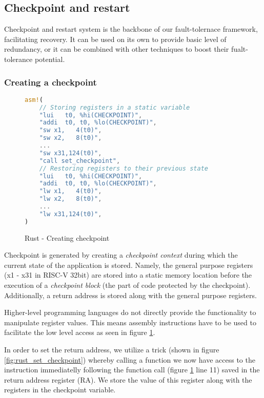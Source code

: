 \subsection{Checkpoint and restart}

Checkpoint and restart system is the backbone of our fault-tolernace framework, facilitating recovery. It can be used on its own to provide basic level of redundancy, or it can be combined with other techniques to boost their fualt-tolerance potential.

\subsubsection{Creating a checkpoint} \label{sec:creating_checkpoint}

\begin{figure}[!h]
\begin{lstlisting}[language=Rust]
asm!(
    // Storing registers in a static variable
    "lui   t0, %hi(CHECKPOINT)",
    "addi  t0, t0, %lo(CHECKPOINT)",
    "sw x1,   4(t0)",
    "sw x2,   8(t0)",
    ...
    "sw x31,124(t0)",
    "call set_checkpoint",
    // Restoring registers to their previous state
    "lui   t0, %hi(CHECKPOINT)",
    "addi  t0, t0, %lo(CHECKPOINT)",
    "lw x1,   4(t0)",
    "lw x2,   8(t0)",
    ...
    "lw x31,124(t0)",
)
\end{lstlisting}
\caption{Rust - Creating checkpoint}
\label{fig:rust_create_checkpoint}
\end{figure}

Checkpoint is generated by creating a \textit{checkpoint context} during which the current state of the application is stored. Namely, the general purpose registers (x1 - x31 in RISC-V 32bit) are stored into a static memory location before the execution of a \textit{checkpoint block} (the part of code protected by the checkpoint). Additionally, a return address is stored along with the general purpose registers. 

Higher-level programming languages do not directly provide the functionality to manipulate register values. This means assembly instructions have to be used to facilitate the low level access as seen in figure \ref{fig:rust_create_checkpoint}.

In order to set the return address, we utilize a trick (shown in figure \ref{fig:rust_set_checkpoint}) whereby calling a function we now have access to the instruction immediatelly following the function call (figure \ref{fig:rust_create_checkpoint} line 11) saved in the return address register (RA). We store the value of this register along with the registers in the checkpoint variable.

